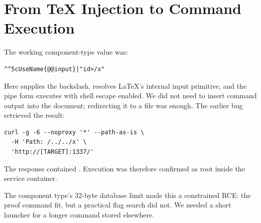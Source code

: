\section{From TeX Injection to Command Execution}
\label{sec:rce}

The working component-type value was:

\begin{lstlisting}
^^5cUseName{@@input}|"id>/x"
\end{lstlisting}

Here  supplies the backslash,
 resolves LaTeX's internal input
primitive, and the pipe form executes  with shell escape enabled.
We did not need to insert command output into the document; redirecting it
to a file was enough. The earlier  bug retrieved the result:

\begin{lstlisting}
curl -g -6 --noproxy '*' --path-as-is \
  -H 'Path: /../../x' \
  'http://[TARGET]:1337/'
\end{lstlisting}

The response contained .
Execution was therefore confirmed as root inside the service container.

The component type's 32-byte database limit made this a constrained RCE:
the proof command fit, but a practical flag search did not. We needed a
short launcher for a longer command stored elsewhere.
